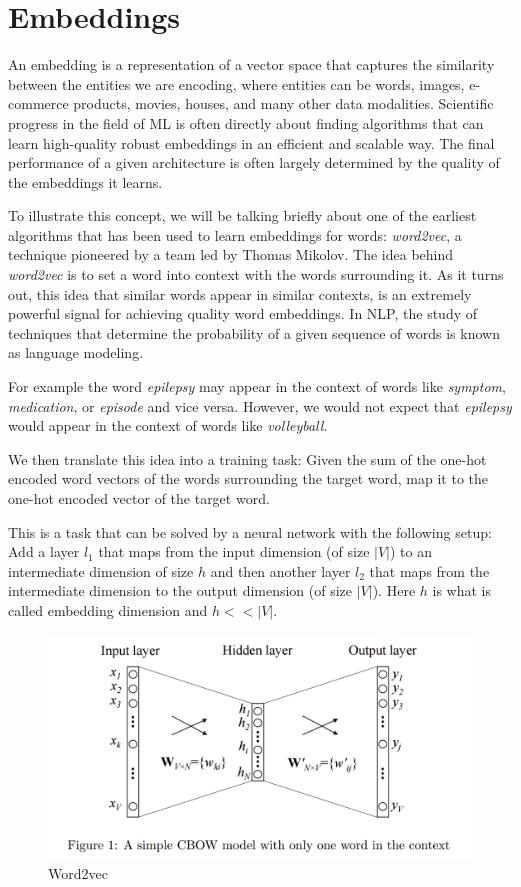 \section{Embeddings}
\label{embeddings}
An embedding is a representation of a vector space that captures the similarity between the entities we are encoding, where entities can be words, images, e-commerce products, movies, houses, and many other data modalities.
Scientific progress in the field of ML is often directly about finding algorithms that can learn high-quality robust embeddings in an efficient and scalable way. The final performance of a given architecture is often largely determined by the quality of the embeddings it learns.

To illustrate this concept, we will be talking briefly about one of the earliest algorithms that has been used to learn embeddings for words: \textit{word2vec}, a technique pioneered by a team led by Thomas Mikolov.\cite{https://doi.org/10.48550/arxiv.1301.3781}
The idea behind \textit{word2vec} is to set a word into context with the words surrounding it. As it turns out, this idea that similar words appear in similar contexts, is an extremely powerful signal for achieving quality word embeddings. In NLP, the study of techniques that determine the probability of a given sequence of words is known as language modeling.

For example the word \textit{epilepsy} may appear in the context of words like \textit{symptom}, \textit{medication}, or \textit{episode} and vice versa.
However, we would not expect that \textit{epilepsy} would appear in the context of words like \textit{volleyball}.

We then translate this idea into a training task:
Given the sum of the one-hot encoded word vectors of the words surrounding the target word, map it to the one-hot encoded vector of the target word.

This is a task that can be solved by a neural network with the following setup:
Add a layer $l_1$ that maps from the input dimension (of size $|V|$) to an intermediate dimension of size $h$ and then another layer $l_2$ that maps from the intermediate dimension to the output dimension (of size $|V|$).
Here $h$ is what is called embedding dimension and $h << |V|$.
\begin{figure}
  \includegraphics[width=\linewidth]{chapters/NLP/figures/word2vec.png}
  \caption{Word2vec}
  \label{fig:word2vec}
\end{figure}

